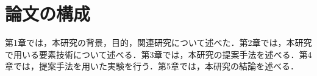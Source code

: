 
\section{論文の構成}

  第1章では，本研究の背景，目的，関連研究について述べた．第2章では，本研究で用いる要素技術について述べる．第3章では，本研究の提案手法を述べる．第4章では，提案手法を用いた実験を行う．第5章では，本研究の結論を述べる．

\newpage
